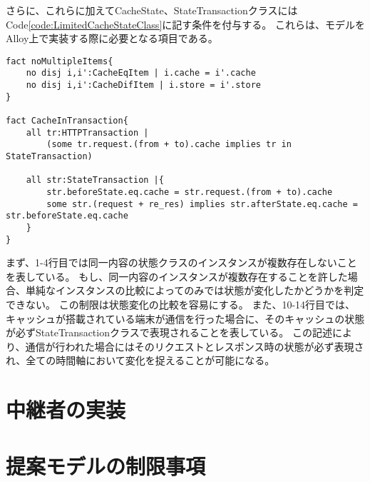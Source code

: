\documentclass[12pt,a4paper]{jbook}
\begin{document}
\color{red}
さらに、これらに加えてCacheState、StateTransactionクラスにはCode\ref{code:LimitedCacheStateClass}に記す条件を付与する。
\color{black}
これらは、モデルをAlloy上で実装する際に必要となる項目である。
\begin{lstlisting}[caption=CacheStateクラスの制限, label=code:LimitedCacheStateClass]
fact noMultipleItems{
	no disj i,i':CacheEqItem | i.cache = i'.cache
	no disj i,i':CacheDifItem | i.store = i'.store
}

fact CacheInTransaction{
	all tr:HTTPTransaction |
		(some tr.request.(from + to).cache implies tr in StateTransaction)

	all str:StateTransaction |{
		str.beforeState.eq.cache = str.request.(from + to).cache
		some str.(request + re_res) implies str.afterState.eq.cache = str.beforeState.eq.cache
	}
}
\end{lstlisting}
まず、1-4行目では同一内容の状態クラスのインスタンスが複数存在しないことを表している。
もし、同一内容のインスタンスが複数存在することを許した場合、単純なインスタンスの比較によってのみでは状態が変化したかどうかを判定できない。
この制限は状態変化の比較を容易にする。
\color{red}
また、10-14行目では、キャッシュが搭載されている端末が通信を行った場合に、そのキャッシュの状態が必ずStateTransactionクラスで表現されることを表している。
この記述により、通信が行われた場合にはそのリクエストとレスポンス時の状態が必ず表現され、全ての時間軸において変化を捉えることが可能になる。
\color{black}

\section{中継者の実装}
\section{提案モデルの制限事項}
\end{document}
